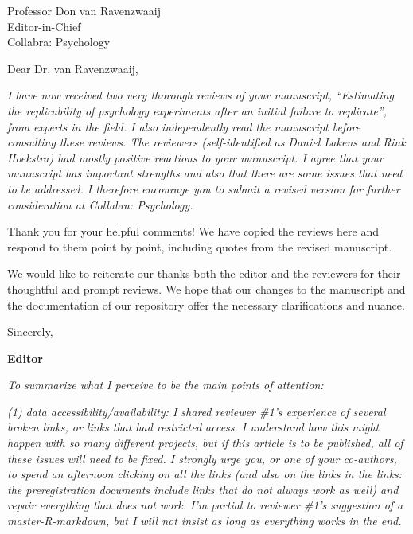 \documentclass{stanfordletter}
\newcounter{section}
\newcommand{\section}[1]{
	\bigskip
	{\normalfont\Large\bfseries #1}}
\newcommand{\theysaid}[1]{\begin{leftbar} \noindent 
		\textsl{ #1}\end{leftbar}}
\begin{document}
	\signature{\vspace{-35pt} Veronica Boyce, \\ on behalf of the author team}
	
	
	\begin{letter}{Professor Don van Ravenzwaaij \\ Editor-in-Chief \\ Collabra: Psychology }
		
		
		\opening{Dear Dr. van Ravenzwaaij,} 
		
		
		
		\theysaid{I have now received two very thorough reviews of your manuscript, “Estimating the replicability of psychology experiments after an initial failure to replicate”, from experts in the field. I also independently read the manuscript before consulting these reviews. The reviewers (self-identified as Daniel Lakens and Rink Hoekstra) had mostly positive reactions to your manuscript. I agree that your manuscript has important strengths and also that there are some issues that need to be addressed. I therefore encourage you to submit a revised version for further consideration at Collabra: Psychology.}
		
		Thank you for your helpful comments! We have copied the reviews here and respond to them point by point, including quotes from the revised manuscript. 
		
		We would like to reiterate our thanks both the editor and the reviewers for their thoughtful and prompt reviews. We hope that our changes to the manuscript and the documentation of our repository offer the necessary clarifications and nuance. 
		
		\closing{Sincerely,}
		

	
	\section{Editor}
	
	\theysaid{To summarize what I perceive to be the main points of attention:}
	
	\theysaid{(1) data accessibility/availability: I shared reviewer \#1’s experience of several broken links, or links that had restricted access. I understand how this might happen with so many different projects, but if this article is to be published, all of these issues will need to be fixed. I strongly urge you, or one of your co-authors, to spend an afternoon clicking on all the links (and also on the links in the links: the preregistration documents include links that do not always work as well) and repair everything that does not work. I’m partial to reviewer \#1’s suggestion of a master-R-markdown, but I will not insist as long as everything works in the end.}
	

\end{letter}
\end{document}
